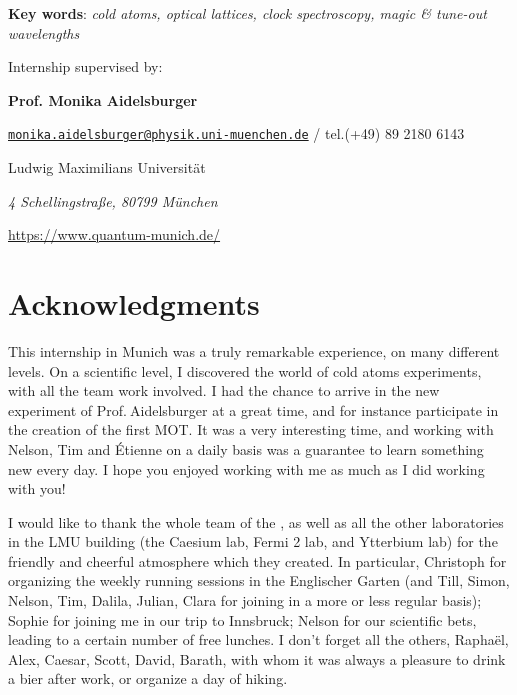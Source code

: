 \documentclass[11pt]{article}
\numberwithin{equation}{section}
\numberwithin{figure}{section}
\begin{document}
\vspace{0.5cm}

\parbox{15cm}{
	\textbf{Key words}: \it cold atoms, optical lattices, clock spectroscopy, magic \& tune-out wavelengths
} %

\vspace{1.5cm}

\parbox{15cm}{
	Internship supervised by:
	
	{\bf Prof. Monika Aidelsburger}
	
	\href{mailto:monika.aidelsburger@physik.uni-muenchen.de}{\tt monika.aidelsburger@physik.uni-muenchen.de} / tel.(+49) 89 2180 6143 \newline
	
	Ludwig Maximilians Universität
	
	{\it 4 Schellingstra\ss e, 80799 München}
	
	\url{https://www.quantum-munich.de/}} %

\newpage

\thispagestyle{empty}

\null
\vfill

\section*{Acknowledgments}

This internship in Munich was a truly remarkable experience, on many different levels. On a scientific level, I discovered the world of cold atoms experiments, with all the team work involved. I had the chance to arrive in the new experiment of Prof.$~$Aidelsburger at a great time, and for instance participate in the creation of the first MOT. It was a very interesting time, and working with Nelson, Tim and \'Etienne on a daily basis was a guarantee to learn something new every day. I hope you enjoyed working with me as much as I did working with you!

I would like to thank the whole team of the , as well as all the other laboratories in the LMU building (the Caesium lab, Fermi 2 lab, and Ytterbium lab) for the friendly and cheerful atmosphere which they created. In particular, Christoph for organizing the weekly running sessions in the Englischer Garten (and Till, Simon, Nelson, Tim, Dalila, Julian, Clara for joining in a more or less regular basis); Sophie for joining me in our trip to Innsbruck; Nelson for our scientific bets, leading to a certain number of free lunches. I don't forget all the others, Raphaël, Alex, Caesar, Scott, David, Barath, with whom it was always a pleasure to drink a bier after work, or organize a day of hiking.
\end{document}
